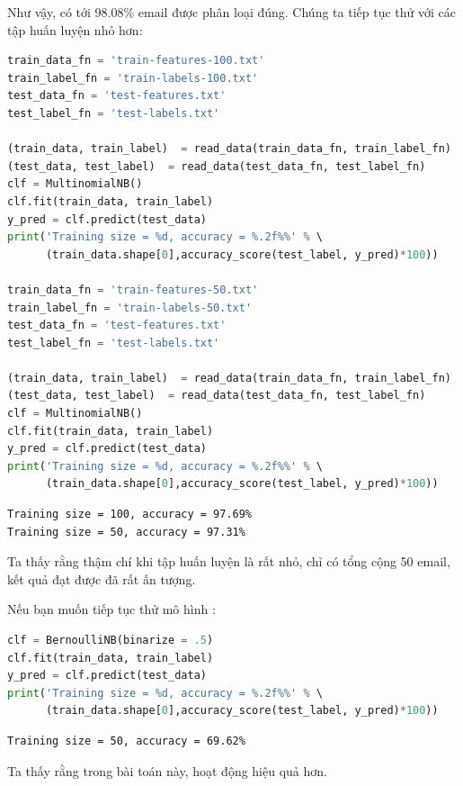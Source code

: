  
Như vậy, có tới 98.08\% email được phân loại đúng. Chúng ta tiếp tục thử với các tập huấn luyện nhỏ hơn:
 
 
\begin{lstlisting}[language=Python]
train_data_fn = 'train-features-100.txt' 
train_label_fn = 'train-labels-100.txt' 
test_data_fn = 'test-features.txt' 
test_label_fn = 'test-labels.txt' 
 
(train_data, train_label)  = read_data(train_data_fn, train_label_fn) 
(test_data, test_label)  = read_data(test_data_fn, test_label_fn) 
clf = MultinomialNB() 
clf.fit(train_data, train_label) 
y_pred = clf.predict(test_data) 
print('Training size = %d, accuracy = %.2f%%' % \ 
      (train_data.shape[0],accuracy_score(test_label, y_pred)*100)) 

train_data_fn = 'train-features-50.txt' 
train_label_fn = 'train-labels-50.txt' 
test_data_fn = 'test-features.txt' 
test_label_fn = 'test-labels.txt' 
 
(train_data, train_label)  = read_data(train_data_fn, train_label_fn) 
(test_data, test_label)  = read_data(test_data_fn, test_label_fn) 
clf = MultinomialNB() 
clf.fit(train_data, train_label) 
y_pred = clf.predict(test_data) 
print('Training size = %d, accuracy = %.2f%%' % \ 
      (train_data.shape[0],accuracy_score(test_label, y_pred)*100)) 
\end{lstlisting}
\kq
\begin{lstlisting}
Training size = 100, accuracy = 97.69% 
Training size = 50, accuracy = 97.31% 
\end{lstlisting} 
 
 
Ta thấy rằng thậm chí khi tập huấn luyện là rất nhỏ, chỉ có tổng cộng 50 email, kết
quả đạt được đã rất ấn tượng.
 
Nếu bạn muốn tiếp tục thử mô hình : 
 
 
\begin{lstlisting}[language=Python]
clf = BernoulliNB(binarize = .5) 
clf.fit(train_data, train_label) 
y_pred = clf.predict(test_data) 
print('Training size = %d, accuracy = %.2f%%' % \ 
      (train_data.shape[0],accuracy_score(test_label, y_pred)*100)) 
\end{lstlisting}
\kq
\begin{lstlisting}
Training size = 50, accuracy = 69.62% 
\end{lstlisting}
 
 
Ta thấy rằng trong bài toán này,  hoạt động hiệu quả hơn.  
 
